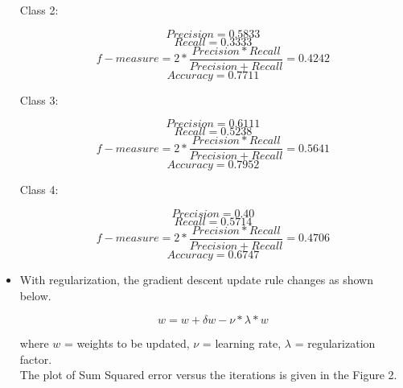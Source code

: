 \documentclass[12pt]{article}
\begin{document}
\begin{itemize}
{Class 2:

\begin{equation}
Precision = 0.5833
\end{equation}
\begin{equation}
Recall = 0.3333
\end{equation}
\begin{equation}
f-measure = 2*\frac{Precision*Recall}{Precision + Recall} = 0.4242
\end{equation}
\begin{equation}
Accuracy = 0.7711
\end{equation}

Class 3:

\begin{equation}
Precision = 0.6111
\end{equation}
\begin{equation}
Recall = 0.5238
\end{equation}
\begin{equation}
f-measure = 2*\frac{Precision*Recall}{Precision + Recall} = 0.5641
\end{equation}
\begin{equation}
Accuracy = 0.7952
\end{equation}

Class 4:

\begin{equation}
Precision = 0.40
\end{equation}
\begin{equation}
Recall = 0.5714
\end{equation}
\begin{equation}
f-measure = 2*\frac{Precision*Recall}{Precision + Recall} = 0.4706
\end{equation}
\begin{equation}
Accuracy = 0.6747
\end{equation}

}
\item{
With regularization, the gradient descent update rule changes as shown below.

\begin{equation}
w = w +  \delta w - \nu * \lambda * w
\end{equation}

where $w$ = weights to be updated, $\nu$ = learning rate, $\lambda$ = regularization factor.\\

The plot of Sum Squared error versus the iterations is given in the Figure 2.

}
\end{itemize}
\end{document}
